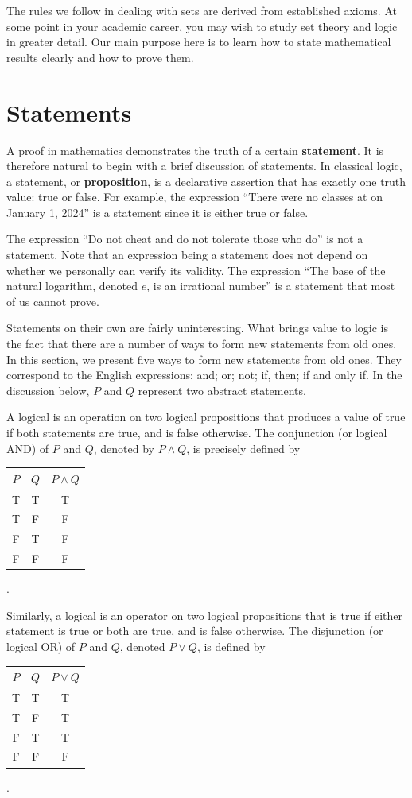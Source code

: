 The rules we follow in dealing with sets are derived from established axioms.
At some point in your academic career, you may wish to study set theory and logic in greater detail.
Our main purpose here is to learn how to state mathematical results clearly and how to prove them.


\section{Statements}\label{section:Statements}

A proof in mathematics demonstrates the truth of a certain \textbf{statement}.
It is therefore natural to begin with a brief discussion of statements.
In classical logic, a statement, or \textbf{proposition}, is a declarative assertion that has exactly one truth value: true or false.
For example, the expression ``There were no classes at \univ on January 1, 2024'' is a statement since it is either true or false.

The expression ``Do not cheat and do not tolerate those who do'' is not a statement.
Note that an expression being a statement does not depend on whether we personally can verify its validity.
The expression ``The base of the natural logarithm, denoted $e$, is an irrational number'' is a statement that most of us cannot prove.

Statements on their own are fairly uninteresting.
What brings value to logic is the fact that there are a number of ways to form new statements from old ones.
In this section, we present five ways to form new statements from old ones.
They correspond to the English expressions: and; or; not; if, then; if and only if.
In the discussion below, $P$ and $Q$ represent two abstract statements.

A logical  is an operation on two logical propositions that produces a value of true if both statements are true, and is false otherwise.
The conjunction (or logical AND) of $P$ and $Q$, denoted by $P \wedge Q$, is precisely defined by
\begin{center}
\begin{tabular}{|c|c|c|}
\hline
$P$ & $Q$ & $P \wedge Q$ \tabularnewline
\hline
T & T & T \tabularnewline
T & F & F \tabularnewline
F & T & F \tabularnewline
F & F & F \tabularnewline
\hline
\end{tabular} .
\end{center}

Similarly, a logical  is an operator on two logical propositions that is true if either statement is true or both are true, and is false otherwise.
The disjunction (or logical OR) of $P$ and $Q$, denoted $P \vee Q$, is defined by
\begin{center}
\begin{tabular}{|c|c|c|}
\hline
$P$ & $Q$ & $P \vee Q$ \tabularnewline
\hline
T & T & T \tabularnewline
T & F & T \tabularnewline
F & T & T \tabularnewline
F & F & F \tabularnewline
\hline
\end{tabular} .
\end{center}

